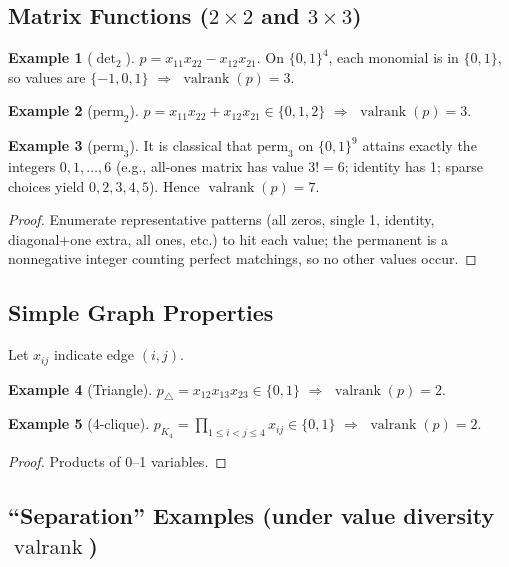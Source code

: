 \documentclass[12pt]{article}
\newcommand{\valrank}{\operatorname{valrank}}
\theoremstyle{definition}
\theoremstyle{definition}
\newtheorem{example}{Example}
\theoremstyle{remark}
\theoremstyle{remark}
\begin{document}
\subsection{Matrix Functions ($2 \times 2$ and $3 \times 3$)}

\begin{example}[$\det_2$]
$p = x_{11}x_{22} - x_{12}x_{21}$. On $\{0,1\}^4$, each monomial is in $\{0,1\}$, so values are $\{-1,0,1\}$ $\Rightarrow$ $\valrank(p) = 3$.
\end{example}

\begin{example}[$\mathrm{perm}_2$]
$p = x_{11}x_{22} + x_{12}x_{21} \in \{0,1,2\}$ $\Rightarrow$ $\valrank(p) = 3$.
\end{example}

\begin{example}[$\mathrm{perm}_3$]
It is classical that $\mathrm{perm}_3$ on $\{0,1\}^9$ attains exactly the integers $0,1,\ldots,6$ (e.g., all-ones matrix has value $3! = 6$; identity has 1; sparse choices yield $0,2,3,4,5$). Hence $\valrank(p) = 7$.
\end{example}

\begin{proof}
Enumerate representative patterns (all zeros, single 1, identity, diagonal+one extra, all ones, etc.) to hit each value; the permanent is a nonnegative integer counting perfect matchings, so no other values occur.
\end{proof}

\subsection{Simple Graph Properties}

Let $x_{ij}$ indicate edge $(i,j)$.

\begin{example}[Triangle]
$p_\triangle = x_{12}x_{13}x_{23} \in \{0,1\}$ $\Rightarrow$ $\valrank(p) = 2$.
\end{example}

\begin{example}[4-clique]
$p_{K_4} = \prod_{1 \leq i < j \leq 4} x_{ij} \in \{0,1\}$ $\Rightarrow$ $\valrank(p) = 2$.
\end{example}

\begin{proof}
Products of 0--1 variables.
\end{proof}

\subsection{``Separation'' Examples (under value diversity $\valrank$)}
\end{document}
